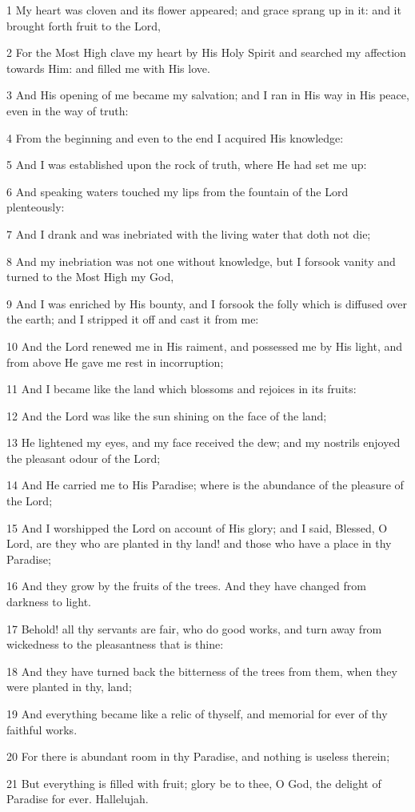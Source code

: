 \par 1 My heart was cloven and its flower appeared; and grace sprang up in it: and it brought forth fruit to the Lord,
\par 2 For the Most High clave my heart by His Holy Spirit and searched my affection towards Him: and filled me with His love.
\par 3 And His opening of me became my salvation; and I ran in His way in His peace, even in the way of truth:
\par 4 From the beginning and even to the end I acquired His knowledge:
\par 5 And I was established upon the rock of truth, where He had set me up:
\par 6 And speaking waters touched my lips from the fountain of the Lord plenteously:
\par 7 And I drank and was inebriated with the living water that doth not die;
\par 8 And my inebriation was not one without knowledge, but I forsook vanity and turned to the Most High my God,
\par 9 And I was enriched by His bounty, and I forsook the folly which is diffused over the earth; and I stripped it off and cast it from me:
\par 10 And the Lord renewed me in His raiment, and possessed me by His light, and from above He gave me rest in incorruption;
\par 11 And I became like the land which blossoms and rejoices in its fruits:
\par 12 And the Lord was like the sun shining on the face of the land;
\par 13 He lightened my eyes, and my face received the dew; and my nostrils enjoyed the pleasant odour of the Lord;
\par 14 And He carried me to His Paradise; where is the abundance of the pleasure of the Lord;
\par 15 And I worshipped the Lord on account of His glory; and I said, Blessed, O Lord, are they who are planted in thy land! and those who have a place in thy Paradise;
\par 16 And they grow by the fruits of the trees. And they have changed from darkness to light.
\par 17 Behold! all thy servants are fair, who do good works, and turn away from wickedness to the pleasantness that is thine:
\par 18 And they have turned back the bitterness of the trees from them, when they were planted in thy, land;
\par 19 And everything became like a relic of thyself, and memorial for ever of thy faithful works.
\par 20 For there is abundant room in thy Paradise, and nothing is useless therein;
\par 21 But everything is filled with fruit; glory be to thee, O God, the delight of Paradise for ever. Hallelujah.

